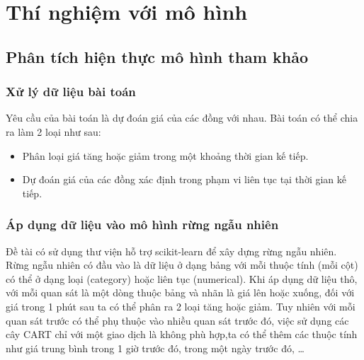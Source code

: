 \chapter{Thí nghiệm với mô hình}

\section{Phân tích hiện thực mô hình tham khảo}
\subsection{Xử lý dữ liệu bài toán}
Yêu cầu của bài toán là dự đoán giá của các đồng với nhau. Bài toán có thể chia ra làm 2 loại như sau:
\begin{itemize}
	\item Phân loại giá tăng hoặc giảm trong một khoảng thời gian kế tiếp.
	\item Dự đoán giá của các đồng xác định trong phạm vi liên tục tại thời gian kế tiếp.
\end{itemize}

\subsection{Áp dụng dữ liệu vào mô hình rừng ngẫu nhiên}
 Đề tài có sử dụng thư viện hỗ trợ scikit-learn để xây dựng rừng ngẫu nhiên.
 Rừng ngẫu nhiên có đầu vào là dữ liệu ở dạng bảng với mỗi thuộc tính (mỗi cột) có thể ở dạng loại (category) hoặc liên tục (numerical). Khi áp dụng dữ liệu thô, với mỗi quan sát là một dòng thuộc bảng và nhãn là giá lên hoặc xuống, đối với giá trong 1 phút sau ta có thể phân ra 2 loại tăng hoặc giảm. Tuy nhiên với mỗi quan sát trước có thể phụ thuộc vào nhiều quan sát trước đó, việc sử dụng các cây CART chỉ với một giao dịch là không phù hợp,ta có thể thêm các thuộc tính như giá trung bình trong 1 giờ trước đó, trong một ngày trước đó, \dots
 
